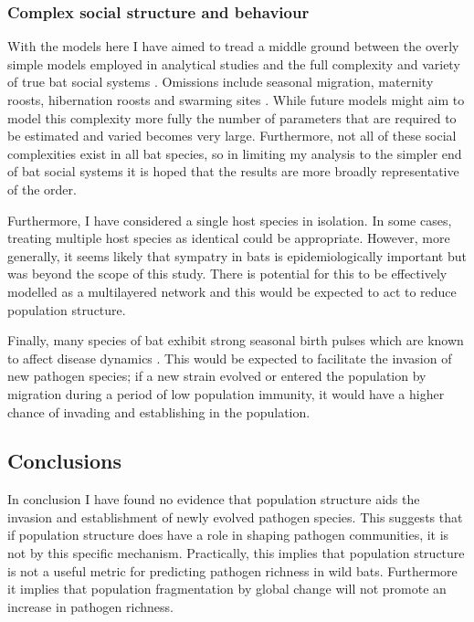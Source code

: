\subsubsection{Complex social structure and behaviour}

With the models here I have aimed to tread a middle ground between the overly simple models employed in analytical studies \cite{allen2004sis} and the full complexity and variety of true bat social systems \cite{kerth2008causes}.
Omissions include seasonal migration,  maternity roosts, hibernation roosts and swarming sites \cite{kerth2008causes, fleming2003ecology, richter2008first, cryan2014continental}. 
While future models might aim to model this complexity more fully the number of parameters that are required to be estimated and varied becomes very large.
Furthermore, not all of these social complexities exist in all bat species, so in limiting my analysis to the simpler end of bat social systems it is hoped that the results are more broadly representative of the order.

Furthermore, I have considered a single host species in isolation.
In some cases, treating multiple host species as identical could be appropriate.
However, more generally, it seems likely that sympatry in bats is epidemiologically important \cite{brierley2016quantifying, luis2013comparison} but was beyond the scope of this study.
There is potential for this to be effectively modelled as a multilayered network \cite{wang2016structural, funk2010interacting} and this would be expected to act to reduce population structure.

Finally, many species of bat exhibit strong seasonal birth pulses which are known to affect disease dynamics \cite{hayman2015biannual,peel2014effect,amman2012seasonal}.
This would be expected to facilitate the invasion of new pathogen species; if a new strain evolved or entered the population by migration during a period of low population immunity, it would have a higher chance of invading and establishing in the population.

\subsection{Conclusions}

In conclusion I have found no evidence that population structure aids the invasion and establishment of newly evolved pathogen species.
This suggests that if population structure does have a role in shaping pathogen communities, it is not by this specific mechanism.
Practically, this implies that population structure is not a useful metric for predicting pathogen richness in wild bats.
Furthermore it implies that population fragmentation by global change will not promote an increase in pathogen richness.





